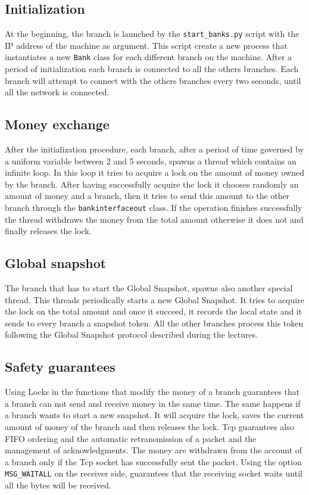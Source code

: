 \documentclass{article}
\begin{document}
        \subsection{Initialization}
        At the beginning, the branch is launched by the \texttt{start\_banks.py} script with the IP address of the machine as argument.
        This script create a new process that instantiates a new \texttt{Bank} class for each different branch on the machine.
        After a period of initialization each branch is connected to all the others branches.
        Each branch will attempt to connect with the others branches every two seconds, until all the network is connected.
        \subsection{Money exchange}
            After the initialization procedure, each branch, after a period of time governed by a uniform variable between 2 and 5 seconds, spawns a thread which contains an infinite loop. In this loop it tries to acquire a lock on the amount of money owned by the branch. After having successfully acquire the lock it chooses randomly an amount of money and a branch, then it tries to send this amount to the other branch through the \texttt{bankinterfaceout} class. If the operation finishes successfully the thread withdraws the money from the total amount otherwise it does not and finally releases the lock.\\
        \subsection{Global snapshot}
        The branch that has to start the Global Snapshot, spawns also another special thread. This threads periodically starts a new Global Snapshot. It tries to acquire the lock on the total amount and once it succeed, it records the local state and it sends to every branch a snapshot token. All the other branches process this token following the Global Snapshot protocol described during the lectures.\\
    \subsection{Safety guarantees}
        Using Locks in the functions that modify the money of a branch guarantees that a branch can not send and receive money in the same time. The same happens if a branch wants to start a new snapshot. It will acquire the lock, saves the current amount of money of the branch and then releases the lock.
        Tcp guarantees also FIFO ordering and the automatic retransmission of a packet and the management of acknowledgments. The money are withdrawn from the account of a branch only if the Tcp socket has successfully sent the packet.
        Using the option \texttt{MSG\_WAITALL} on the receiver side, guarantees that the receiving socket waits until all the bytes will be received.
\end{document}
